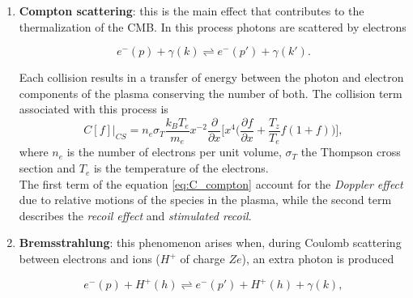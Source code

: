 \begin{enumerate}
    \item \textbf{Compton scattering}: this is the main effect that contributes to the thermalization of the CMB. In this process photons are scattered by electrons 
    \begin{multicols}{2}
        $$e^{-}(p)+\gamma(k)\rightleftharpoons e^{-}(p')+\gamma(k').$$\vspace{4cm}
        
    \end{multicols}
    Each collision results in a transfer of energy between the photon and electron components of the plasma conserving the number of both. The collision term associated with this process is
    \begin{equation}
        C[f]\bigg|_{CS}=n_e\sigma_T\frac{k_BT_e}{m_e}x^{-2}\frac{\partial}{\partial x}\bigg[x^4\bigg(\frac{\partial f}{\partial x}+\frac{T_z}{T_e}f(1+f)\bigg)\bigg],\label{eq:C_compton}
    \end{equation}
    where $n_e$ is the number of electrons per unit volume, $\sigma_T$ the Thompson cross section and $T_e$ is the temperature of the electrons. \\
    The first term of the equation \eqref{eq:C_compton} account for the \emph{Doppler effect} due to relative motions of the species in the plasma, while the second term describes the \emph{recoil effect} and \emph{stimulated recoil}.
    \item \textbf{Bremsstrahlung}: this phenomenon arises when, during Coulomb scattering between electrons and ions ($H^+$ of charge $Ze$), an extra photon is produced
    \begin{multicols}{2}
        $$e^{-}(p)+H^+(h)\rightleftharpoons e^{-}(p')+H^+(h)+\gamma(k),$$\vspace{4cm}\\
\end{multicols}
\end{enumerate}
